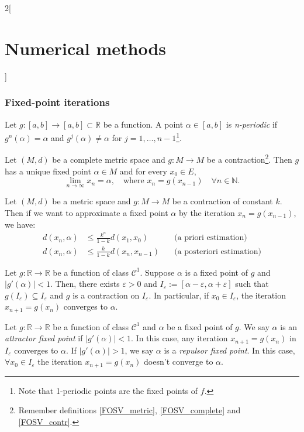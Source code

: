 \documentclass[class=article,10pt,crop=false]{standalone}
\begin{document}
\begin{multicols}{2}[\section{Numerical methods}]
\subsubsection*{Fixed-point iterations}
\begin{definition}
Let $g:[a,b]\rightarrow[a,b]\subset\mathbb{R}$ be a function. A point $\alpha\in[a,b]$ is \textit{n-periodic} if $g^n(\alpha)=\alpha$ and $g^j(\alpha)\ne\alpha$ for $j=1,\ldots,n-1$\footnote{Note that 1-periodic points are the fixed points of $f$.}.
\end{definition}
\begin{theorem}
Let $(M,d)$ be a complete metric space and $g:M\rightarrow M$ be a contraction\footnote{Remember definitions \ref{FOSV_metric}, \ref{FOSV_complete} and \ref{FOSV_contr}.}. Then $g$ has a unique fixed point $\alpha\in M$ and for every $x_0\in E$, $$\lim_{n\to\infty}x_n=\alpha,\quad\text{where }x_n=g(x_{n-1})\quad\forall n\in\mathbb{N}.$$
\end{theorem}
\begin{prop}
Let $(M,d)$ be a metric space and $g:M\rightarrow M$ be a contraction of constant $k$. Then if we want to approximate a fixed point $\alpha$ by the iteration $x_n=g(x_{n-1})$, we have:
\begin{align*}
    d(x_n,\alpha)&\leq\frac{k^n}{1-k}d(x_1,x_0)\quad&\text{(a priori estimation)}\\
    d(x_n,\alpha)&\leq\frac{k}{1-k}d(x_n,x_{n-1})\quad&\text{(a posteriori estimation)}
\end{align*}
\end{prop}
\begin{corollary}
Let $g:\mathbb{R}\rightarrow\mathbb{R}$ be a function of class $\mathcal{C}^1$. Suppose $\alpha$ is a fixed point of $g$ and $|g'(\alpha)|<1$. Then, there exists $\varepsilon>0$ and $I_\varepsilon:=[\alpha-\varepsilon,\alpha+\varepsilon]$ such that $g(I_\varepsilon)\subseteq I_\varepsilon$ and $g$ is a contraction on $I_\varepsilon$. In particular, if $x_0\in I_\varepsilon$, the iteration $x_{n+1}=g(x_n)$ converges to $\alpha$.
\end{corollary}
\begin{definition}
Let $g:\mathbb{R}\rightarrow\mathbb{R}$ be a function of class $\mathcal{C}^1$ and $\alpha$ be a fixed point of $g$. We say $\alpha$ is an \textit{attractor fixed point} if $|g'(\alpha)|<1$. In this case, any iteration $x_{n+1}=g(x_n)$ in $I_\varepsilon$ converges to $\alpha$. If $|g'(\alpha)|>1$, we say $\alpha$ is a \textit{repulsor fixed point}. In this case, $\forall x_0\in I_\varepsilon$ the iteration $x_{n+1}=g(x_n)$ doesn't converge to $\alpha$.

\end{definition}
\end{multicols}
\end{document}
